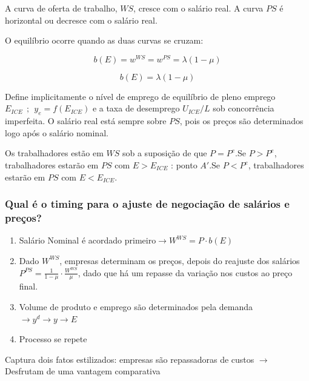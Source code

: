 \documentclass[a4paper,12pt]{article}[abntex2]
\begin{document}
A curva de oferta de trabalho, \( WS \), cresce com o salário real. A curva \( PS \) é horizontal ou decresce com o salário real.

O equilíbrio ocorre quando as duas curvas se cruzam:

\[
b(E) = w^{WS} = w^{PS} = \lambda (1 - \mu)
\]

\[
b(E) = \lambda (1 - \mu)
\]

Define implicitamente o nível de emprego de equilíbrio de pleno emprego \( E_{ICE} \ \ ; \ \ y_e=f(E_{ICE}) \) e a taxa de desemprego \( U_{ICE} / L \) sob concorrência imperfeita.
O salário real está sempre sobre \( PS \), pois os preços são determinados logo após o salário nominal. 

Os trabalhadores estão em \( WS \) sob a suposição de que \( P = P^e \).Se \( P > P^e \), trabalhadores estarão em \( PS \) com \( E > E_{ICE} \) : ponto \( A' \).Se \( P < P^e \), trabalhadores estarão em \( PS \) com \( E < E_{ICE} \).

\subsubsection{\textbf{Qual é o timing para o ajuste de negociação de salários e preços? }}\begin{enumerate}
    \item Salário Nominal é acordado primeiro\(\rightarrow W^{WS}=P\cdot b(E)\)
    \item Dado \(W^{WS}\), empresas determinam os preços, depois do reajuste dos salários \(P^{PS}=\frac{1}{1-\mu}\cdot \frac{W^{WS}}{\mu}\), dado que há um repasse da variação nos custos ao preço final.
    \item Volume de produto e emprego são determinados pela demanda \(\rightarrow y^d\rightarrow y \rightarrow E\)
    \item Processo se repete
\end{enumerate}

Captura dois fatos estilizados: empresas são repassadoras de custos \(\rightarrow\) Desfrutam de uma vantagem comparativa 
\end{document}
